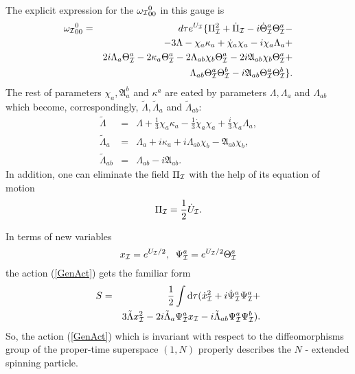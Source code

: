 \documentclass[a4paper,twocolumn,showpacs,preprintnumbers,amsmath,amssymb]{revtex4}
\newcommand{\A}{\mathfrak{A}}
\begin{document}
The explicit expression for the ${\omega_{\cal I}}^0_{00}$ in this gauge is
\begin{eqnarray}\label{omega000}
{\omega_{\cal I}}^0_{00}&=&d\tau e^{U_{\cal I}}\{\Pi_{\cal I}^2+{\dot \Pi_{\cal I}}-
i {\dot \Theta_{\cal I}^a}\Theta_{\cal I}^a-\\\nonumber
&&-3\Lambda-\chi_a\kappa_a+\dot\chi_a\chi_a-
i\chi_a\Lambda_a+\\\nonumber
&&2i\Lambda_a\Theta_{\cal I}^a -2\kappa_a\Theta_{\cal I}^a-
2\Lambda_{ab}\chi_b\Theta_{\cal I}^a-
2i\A_{ab}\chi_b\Theta_{\cal I}^a+\\\nonumber
&&\Lambda_{ab}\Theta_{\cal I}^a\Theta_{\cal I}^b-
i\A_{ab}\Theta_{\cal I}^a\Theta_{\cal I}^b\}.
\end{eqnarray}
The rest of parameters $\chi_a, \A_a^b$ and $\kappa^a$ are eated
by parameters $\Lambda, \Lambda_a$ and
$\Lambda_{ab}$ which become, correspondingly, $\tilde\Lambda,
\tilde\Lambda_a$ and
$\tilde\Lambda_{ab}$:
\begin{eqnarray}\label{redef}
\tilde\Lambda&=&\Lambda+\frac{1}{3}\chi_a\kappa_a-\frac{1}{3}\dot\chi_a\chi_a+
\frac{i}{3}\chi_a\Lambda_a,\\\nonumber
\tilde\Lambda_a&=&\Lambda_a +i\kappa_a+
i\Lambda_{ab}\chi_b-
\A_{ab}\chi_b,\\\nonumber
\tilde\Lambda_{ab}&=&\Lambda_{ab}-
i\A_{ab}.
\end{eqnarray}
In addition, one can eliminate the field
$\Pi_{\cal I}$ with the help of its equation of motion
\begin{equation}
\Pi_{\cal I}=\frac{1}{2}\dot U_{\cal I}.
\end{equation}

In terms of new variables
\begin{equation}
x_{\cal I}=e^{U_{\cal I}/2},\;\;
\Psi_{\cal I}^a=e^{U_{\cal I}/2}\Theta_{\cal I}^a
\end{equation}
the action (\ref{GenAct}) gets the familiar form\cite{S}
\begin{eqnarray}               \label{Nconf}
S&=&\frac{1}{2}\int{\rm d} \tau(\dot{x}^2_{\cal I}+
i\dot\Psi_{\cal I}^a\Psi_{\cal I}^a+\\\nonumber
&&3\tilde\Lambda x^2_{\cal I}-2i\tilde\Lambda_a\Psi_{\cal I}^ax_{\cal I}-
i\tilde\Lambda_{ab}\Psi_{\cal I}^a\Psi_{\cal I}^b).
\end{eqnarray}
So, the action (\ref{GenAct}) which is
invariant with respect to the diffeomorphisms group
of the proper-time superspace $(1,N)$ properly describes
the $N$ - extended spinning particle.
\end{document}
